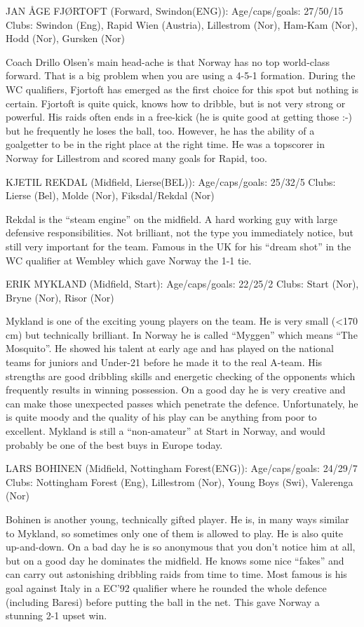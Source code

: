 JAN {\AA}GE FJ{\O}RTOFT (Forward, Swindon(ENG)):
Age/caps/goals: 27/50/15
Clubs: Swindon (Eng), Rapid Wien (Austria), Lillestrom (Nor), Ham-Kam (Nor),
       Hodd (Nor), Gursken (Nor)

Coach Drillo Olsen's main head-ache is that Norway has no top world-class
forward. That is a big problem when you are using a 4-5-1 formation. During 
the WC qualifiers, Fjortoft has emerged as the first choice for this spot but 
nothing is certain. Fjortoft is quite quick, knows how to dribble, but is not 
very strong or powerful. His raids often ends in a free-kick (he is quite good
at getting those :-) but he frequently he loses the ball, too. However, he has 
the ability of a goalgetter to be in the right place at the right time. He was 
a topscorer in Norway for Lillestrom and scored many goals for Rapid, too.  


KJETIL REKDAL (Midfield, Lierse(BEL)):
Age/caps/goals: 25/32/5
Clubs: Lierse (Bel), Molde (Nor), Fiksdal/Rekdal (Nor)

Rekdal is the ``steam engine'' on the midfield. A hard working guy with large 
defensive responsibilities. Not brilliant, not the type you immediately notice, 
but still very important for the team. Famous in the UK for his ``dream shot'' 
in the WC qualifier at Wembley which gave Norway the 1-1 tie.


ERIK MYKLAND (Midfield, Start):
Age/caps/goals: 22/25/2
Clubs: Start (Nor), Bryne (Nor), Risor (Nor)

Mykland is one of the exciting young players on the team. He is very small 
(<170 cm) but technically brilliant. In Norway he is called ``Myggen'' which 
means ``The Mosquito''. He showed his talent at early age and has played on the 
national teams for juniors and Under-21 before he made it to the real A-team. 
His strengths are good dribbling skills and energetic checking of the opponents
which frequently results in winning possession. On a good day he is very
creative and can make those unexpected passes which penetrate the defence. 
Unfortunately, he is quite moody and the quality of his play can be anything 
from poor to excellent. Mykland is still a ``non-amateur'' at Start in Norway, 
and would probably be one of the best buys in Europe today.  

LARS BOHINEN (Midfield, Nottingham Forest(ENG)):
Age/caps/goals: 24/29/7
Clubs: Nottingham Forest (Eng), Lillestrom (Nor), Young Boys (Swi),
       Valerenga (Nor)

Bohinen is another young, technically gifted player. He is, in many ways similar 
to Mykland, so sometimes only one of them is allowed to play. He is also quite 
up-and-down. On a bad day he is so anonymous that you don't notice him at all, 
but on a good day he dominates the midfield. He knows some nice ``fakes'' and 
can carry out astonishing dribbling raids from time to time.  Most famous is 
his goal against Italy in a EC'92 qualifier where he rounded the whole defence 
(including Baresi) before putting the ball in the net. This gave Norway a 
stunning 2-1 upset win.
